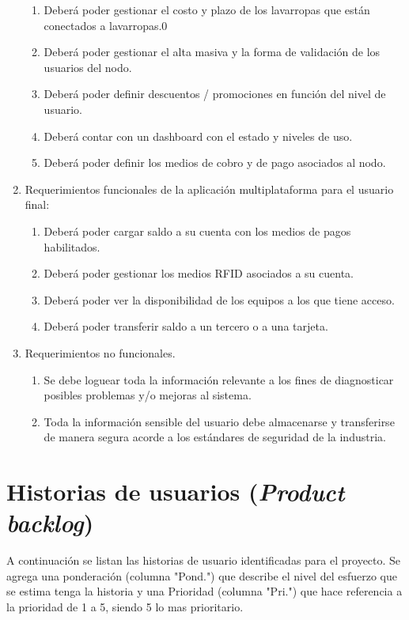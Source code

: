 \documentclass[11pt]{charter}
\begin{document}
\begin{enumerate}
\begin{enumerate}
\item Deberá poder gestionar el costo y plazo de los lavarropas que están conectados a lavarropas.0
\item Deberá poder gestionar el alta masiva y la forma de validación de los usuarios del nodo.
\item Deberá poder definir descuentos / promociones en función del nivel de usuario.
\item Deberá contar con un dashboard con el estado y niveles de uso.
\item Deberá poder definir los medios de cobro y de pago asociados al nodo. 
	\end{enumerate}
\item Requerimientos funcionales de la aplicación multiplataforma para el usuario final: 
\begin{enumerate} 
\item Deberá poder cargar saldo a su cuenta  con los medios de pagos habilitados.
\item Deberá poder gestionar los medios RFID asociados a su cuenta. 
\item Deberá poder ver la disponibilidad de los equipos a los que tiene acceso. 
\item Deberá poder transferir saldo a un tercero o a una tarjeta.
	\end{enumerate}
\item Requerimientos no funcionales.
\begin{enumerate}
\item Se debe loguear toda la información relevante a los fines de diagnosticar posibles problemas y/o mejoras al sistema.
\item Toda la información sensible del usuario debe almacenarse y transferirse de manera segura acorde a los estándares de seguridad de la industria. 
	\end{enumerate}
\end{enumerate}

\section{Historias de usuarios (\textit{Product backlog})}
\label{sec:backlog}

A continuación se listan las historias de usuario identificadas para el proyecto. Se agrega una ponderación (columna "Pond.") que describe el nivel del esfuerzo que se estima tenga la historia y una Prioridad (columna "Pri.") que hace referencia a la prioridad de 1 a 5, siendo 5 lo mas prioritario.
\end{document}

